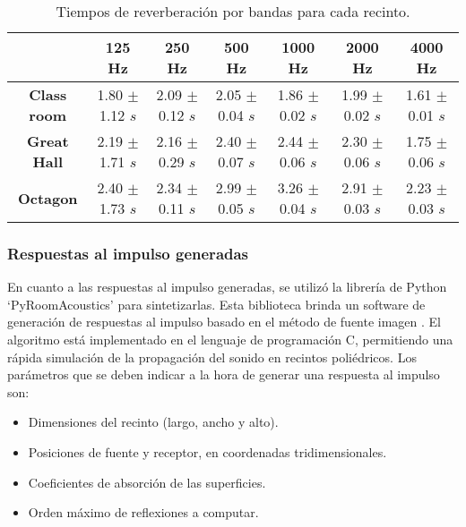 \begin{table}[H]
\centering{}
\caption{Tiempos de reverberación por bandas para cada recinto.}
\begin{adjustbox}{max width=\textwidth}
\begin{tabular}{|c|c|c|c|c|c|c|}
\hline
                    & \textbf{125 Hz} & \textbf{250 Hz} & \textbf{500 Hz} & \textbf{1000 Hz} & \textbf{2000 Hz} & \textbf{4000 Hz} \\ \hline
\textbf{Class room} & 1.80 $\pm$ 1.12 $s$ & 2.09 $\pm$ 0.12 $s$ & 2.05 $\pm$ 0.04 $s$ & 1.86 $\pm$ 0.02 $s$  & 1.99 $\pm$ 0.02 $s$  & 1.61 $\pm$ 0.01 $s$ \\ \hline
\textbf{Great Hall} & 2.19 $\pm$ 1.71 $s$ & 2.16 $\pm$ 0.29 $s$ & 2.40 $\pm$ 0.07 $s$ & 2.44 $\pm$ 0.06 $s$  & 2.30 $\pm$ 0.06 $s$  & 1.75 $\pm$ 0.06 $s$  \\ \hline
\textbf{Octagon}    & 2.40 $\pm$ 1.73 $s$ & 2.34 $\pm$ 0.11 $s$ & 2.99 $\pm$ 0.05 $s$ & 3.26 $\pm$ 0.04 $s$  & 2.91 $\pm$ 0.03 $s$  & 2.23 $\pm$ 0.03 $s$  \\ \hline
\end{tabular}
\end{adjustbox}
\label{table:trs_recintos}
\end{table}


\subsubsection{Respuestas al impulso generadas}

En cuanto a las respuestas al impulso generadas, se utilizó la librería de Python `PyRoomAcoustics' \cite{pyroom} para sintetizarlas. Esta biblioteca brinda un software de generación de respuestas al impulso basado en el método de fuente imagen  \cite{ISM}. El algoritmo está implementado en el lenguaje de programación C, permitiendo una rápida simulación de la propagación del sonido en recintos poliédricos. Los parámetros que se deben indicar a la hora de generar una respuesta al impulso son: 

\begin{itemize}
\item Dimensiones del recinto (largo, ancho y alto).
\item Posiciones de fuente y receptor, en coordenadas tridimensionales.
\item Coeficientes de absorción de las superficies.
\item Orden máximo de reflexiones a computar.
\end{itemize} 

